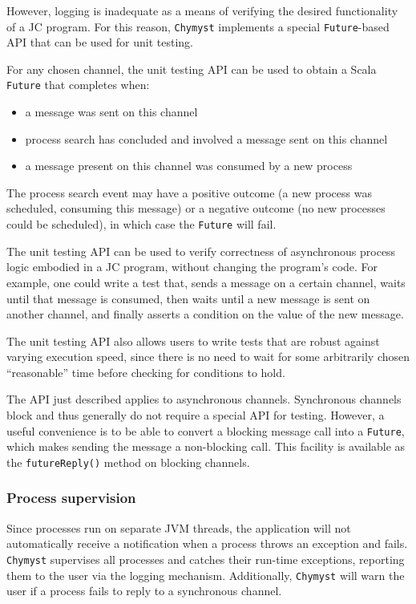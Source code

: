 \documentclass[sigplan,10pt]{acmart}\settopmatter{}
\begin{document}
However, logging is inadequate as a means of verifying the desired
functionality of a JC program. For this reason, \texttt{Chymyst} implements
a special \texttt{Future}-based API that can be used for unit testing. 

For any chosen channel, the unit testing API can be used to obtain
a Scala \texttt{Future} that completes when: 
\begin{itemize}
\item a message was sent on this channel
\item process search has concluded and involved a message sent on this channel
\item a message present on this channel was consumed by a new process
\end{itemize}
The process search event may have a positive outcome (a new process
was scheduled, consuming this message) or a negative outcome (no new
processes could be scheduled), in which case the \texttt{Future} will
fail.

The unit testing API can be used to verify correctness of asynchronous
process logic embodied in a JC program, without changing the program's
code. For example, one could write a test that, sends a message on
a certain channel, waits until that message is consumed, then waits
until a new message is sent on another channel, and finally asserts
a condition on the value of the new message.

The unit testing API also allows users to write tests that are robust
against varying execution speed, since there is no need to wait for
some arbitrarily chosen ``reasonable'' time before checking for
conditions to hold.

The API just described applies to asynchronous channels. Synchronous
channels block and thus generally do not require a special API for
testing. However, a useful convenience is to be able to convert a
blocking message call into a \texttt{Future}, which makes sending
the message a non-blocking call. This facility is available as the
\texttt{futureReply()} method on blocking channels.

\subsubsection{Process supervision}

Since processes run on separate JVM threads, the application will
not automatically receive a notification when a process throws an
exception and fails. \texttt{Chymyst} supervises all processes and
catches their run-time exceptions, reporting them to the user via
the logging mechanism. Additionally, \texttt{Chymyst} will warn the
user if a process fails to reply to a synchronous channel.
\end{document}
